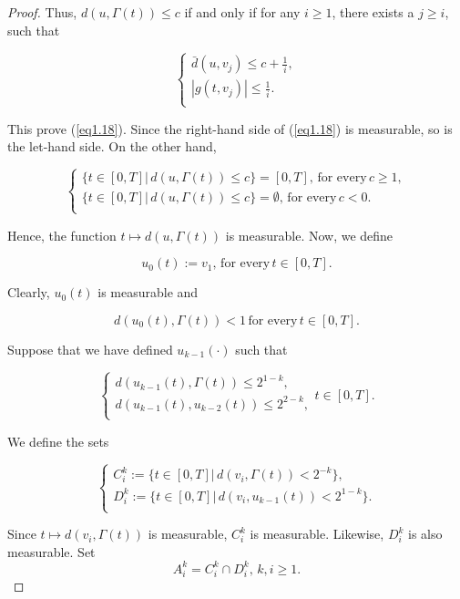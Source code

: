 \begin{proof}
Thus, $d(u,\Gamma(t))\leq c$ if and only if for any $i\geq 1$, there exists a $j\geq i$, such that

$$\left\{ \begin{array}{l}
 \bar{d}(u,v_{j})\leq c+\frac{1}{i}, \\
 |g(t,v_{j})|\leq \frac{1}{i}. \\
\end{array}
\right.$$

This prove (\ref{eq1.18}). Since the right-hand side of (\ref{eq1.18}) is measurable, so is the let-hand side. On the other hand,

$$\left\{ \begin{array}{l}
\{t\in[0,T] |\, d(u,\Gamma(t))\leq c\}=[0,T],\,\mbox{for every}\, c\geq 1, \\
\{t\in[0,T] |\, d(u,\Gamma(t))\leq c\}=\emptyset,\,\mbox{for every}\, c<0. \\
\end{array}
\right.$$

Hence, the function $t\mapsto d(u,\Gamma(t))$ is measurable. Now, we define

$$u_0(t):=v_1,\,\mbox{for every}\, t\in [0,T].$$

Clearly, $u_0(t)$ is measurable and 

$$d(u_0(t),\Gamma(t))<1\,\mbox{for every}\,t\in[0,T].$$

Suppose that we have defined $u_{k-1}(\cdot)$ such that 

\begin{equation}\label{eq1.19}
\left\{ \begin{array}{l}
d(u_{k-1}(t),\Gamma(t))\leq 2^{1-k},  \\
d(u_{k-1}(t),u_{k-2}(t))\leq 2^{2-k},\\
\end{array}
\right. t\in[0,T].
\end{equation}

We define the sets

$$\left\{ \begin{array}{l}
	C^k_i:=\{t\in[0,T] |\, d(v_i,\Gamma(t))<2^{-k}\}, \\
	D^k_i:=\{t\in[0,T] |\, d(v_i,u_{k-1}(t))< 2^{1-k}\}.\\
\end{array}
\right.$$

Since $t\mapsto d(v_i,\Gamma(t))$ is measurable, $C^k_i$ is measurable. Likewise, $D^k_i$ is also measurable. Set
$$A^k_i=C^k_i\cap D^k_i, \,k,i\geq 1.$$


\end{proof}
